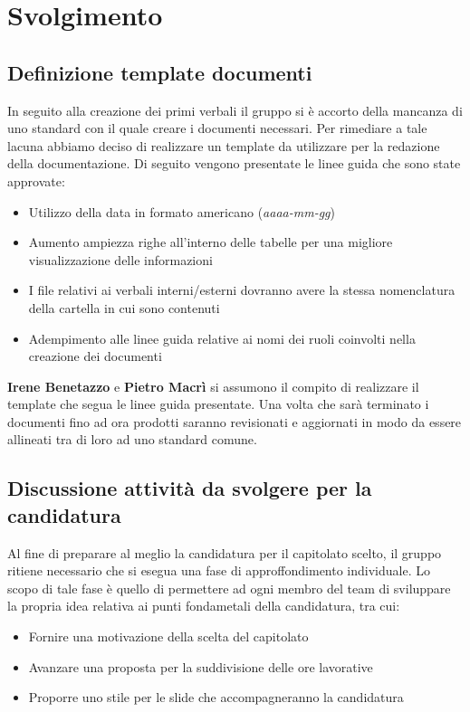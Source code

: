     \section{Svolgimento}
    \subsection {Definizione template documenti}
    In seguito alla creazione dei primi verbali il gruppo si è accorto della mancanza di uno standard con il quale creare i documenti necessari. Per rimediare a tale lacuna abbiamo deciso di realizzare un template da utilizzare per la redazione della documentazione. Di seguito vengono presentate le linee guida che sono state approvate: 
    \begin{itemize}
        \item Utilizzo della data in formato americano (\textit{aaaa-mm-gg})
        \item Aumento ampiezza righe all'interno delle tabelle per una migliore visualizzazione delle informazioni
        \item I file relativi ai verbali interni/esterni dovranno avere la stessa nomenclatura della cartella in cui sono contenuti
        \item Adempimento alle linee guida relative ai nomi dei ruoli coinvolti nella creazione dei documenti
    \end{itemize}
    \textbf{Irene Benetazzo} e \textbf{Pietro Macrì} si assumono il compito di realizzare il template che segua le linee guida presentate. Una volta che sarà terminato i documenti fino ad ora prodotti saranno revisionati e aggiornati in modo da essere allineati tra di loro ad uno standard comune. 
    
    \subsection {Discussione attività da svolgere per la candidatura}
    Al fine di preparare al meglio la candidatura per il capitolato scelto, il gruppo ritiene necessario che si esegua una fase di approffondimento individuale. Lo scopo di tale fase è quello di permettere ad ogni membro del team di sviluppare la propria idea relativa ai punti fondametali della candidatura, tra cui:
    \begin{itemize}
        \item Fornire una motivazione della scelta del capitolato
        \item Avanzare una proposta per la suddivisione delle ore lavorative
        \item Proporre uno stile per le slide che accompagneranno la candidatura
    \end{itemize}

